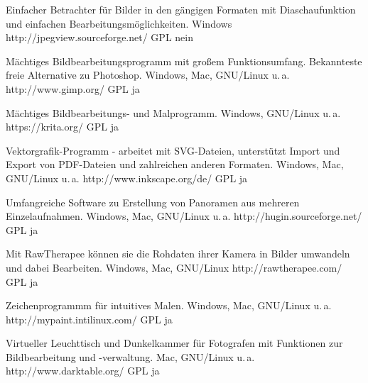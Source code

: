 



{Einfacher Betrachter für Bilder in den gängigen Formaten mit Diaschaufunktion und einfachen Bearbeitungsmöglichkeiten.}
{Windows}
{http://jpegview.sourceforge.net/}
{GPL}
{nein}

{Mächtiges Bildbearbeitungsprogramm mit großem Funktionsumfang. Bekannteste freie Alternative zu Photoshop.}
{Windows, Mac, GNU/Linux u.\,a.}
{http://www.gimp.org/}
{GPL}
{ja}

{Mächtiges Bildbearbeitungs- und Malprogramm.}
{Windows, GNU/Linux u.\,a.}
{https://krita.org/}
{GPL}
{ja}

{Vektorgrafik-Programm - arbeitet mit SVG-Dateien, unterstützt Import und Export von PDF-Dateien und zahlreichen anderen Formaten.}
{Windows, Mac, GNU/Linux u.\,a.}
{http://www.inkscape.org/de/}
{GPL}
{ja}


{Umfangreiche Software zu Erstellung von Panoramen aus mehreren Einzelaufnahmen.}
{Windows, Mac, GNU/Linux u.\,a.}
{http://hugin.sourceforge.net/}
{GPL}
{ja}

{Mit RawTherapee können sie die Rohdaten ihrer Kamera in Bilder umwandeln und dabei Bearbeiten.}
{Windows, Mac, GNU/Linux}
{http://rawtherapee.com/ }
{GPL}
{ja}

{Zeichenprogrammm für intuitives Malen.}
{Windows, Mac, GNU/Linux u.\,a.}
{http://mypaint.intilinux.com/}
{GPL}
{ja}

{Virtueller Leuchttisch und Dunkelkammer für Fotografen mit Funktionen zur Bildbearbeitung und -verwaltung.}
{Mac, GNU/Linux u.\,a.}
{http://www.darktable.org/}
{GPL}
{ja}

\backpage


